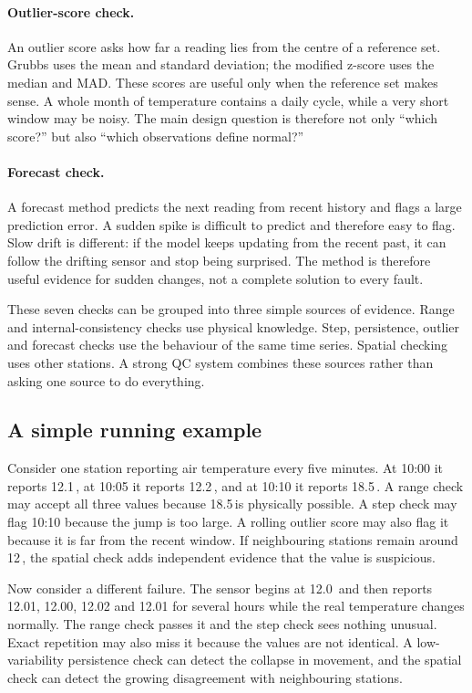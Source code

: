 \paragraph{Outlier-score check.}
An outlier score asks how far a reading lies from the centre of a reference
set. Grubbs uses the mean and standard deviation; the modified z-score uses
the median and MAD. These scores are useful only when the reference set makes
sense. A whole month of temperature contains a daily cycle, while a very
short window may be noisy. The main design question is therefore not only
``which score?'' but also ``which observations define normal?''

\paragraph{Forecast check.}
A forecast method predicts the next reading from recent history and flags a
large prediction error. A sudden spike is difficult to predict and therefore
easy to flag. Slow drift is different: if the model keeps updating from the
recent past, it can follow the drifting sensor and stop being surprised. The
method is therefore useful evidence for sudden changes, not a complete
solution to every fault.

These seven checks can be grouped into three simple sources of evidence.
Range and internal-consistency checks use physical knowledge. Step,
persistence, outlier and forecast checks use the behaviour of the same time
series. Spatial checking uses other stations. A strong QC system combines
these sources rather than asking one source to do everything.

\subsection{A simple running example}

Consider one station reporting air temperature every five minutes. At
10:00 it reports 12.1\,\textcelsius, at 10:05 it reports
12.2\,\textcelsius, and at 10:10 it reports 18.5\,\textcelsius. A range check
may accept all three values because 18.5\,\textcelsius is physically
possible. A step check may flag 10:10 because the jump is too large. A
rolling outlier score may also flag it because it is far from the recent
window. If neighbouring stations remain around 12\,\textcelsius, the spatial
check adds independent evidence that the value is suspicious.

Now consider a different failure. The sensor begins at 12.0\,\textcelsius
and then reports 12.01, 12.00, 12.02 and 12.01 for several hours while the
real temperature changes normally. The range check passes it and the step
check sees nothing unusual. Exact repetition may also miss it because the
values are not identical. A low-variability persistence check can detect the
collapse in movement, and the spatial check can detect the growing
disagreement with neighbouring stations.

